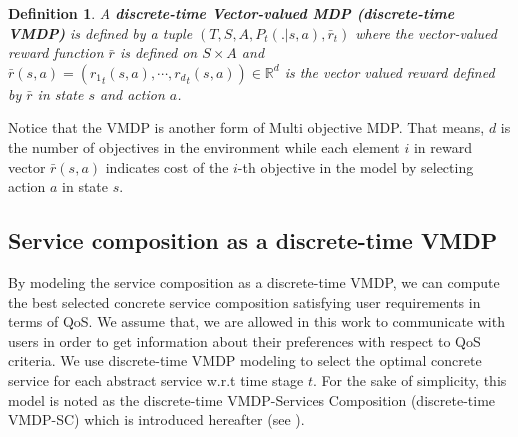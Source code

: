 \documentclass[10pt,journal,compsoc]{IEEEtran}
\newtheorem{definition}{Definition}
\begin{document}
\begin{definition} \cite{alizadeh:hal-01358345}
A \textbf{discrete-time Vector-valued MDP (discrete-time VMDP)} is defined by a tuple $ (T, S, A, P_t(.|s,a), \bar{r}_t)$ where the vector-valued reward function $\bar{r}$ is defined on $S \times A$ and $\bar{r}(s, a) = ({r_1}_t(s,a), \cdots, {r_d}_t(s,a)) \in \mathbb{R}^d$ is the vector valued reward defined by $\bar{r}$ in state $s$ and action $a$. 
\end{definition}

Notice that the VMDP is another form of Multi objective MDP. That means, $d$ is the number of objectives in the environment while each element $i$ in reward vector $\bar{r}(s, a)$ indicates cost of the $i$-th objective in the model by selecting action $a$ in state $s$. 


\subsection{Service composition as a discrete-time VMDP}%
By modeling the service composition as a discrete-time VMDP, we can compute the best selected concrete service composition satisfying user requirements in terms of QoS. We assume that, we are allowed in this work to communicate with users in order to get information about their preferences with respect to QoS criteria. We use discrete-time VMDP modeling to select the optimal concrete service for each abstract service w.r.t time stage $t$. For the sake of simplicity, this model is noted as the discrete-time VMDP-Services Composition (discrete-time VMDP-SC) which is introduced hereafter (see \cite{Wang2010, Mostafa2015}).\\
\end{document}
